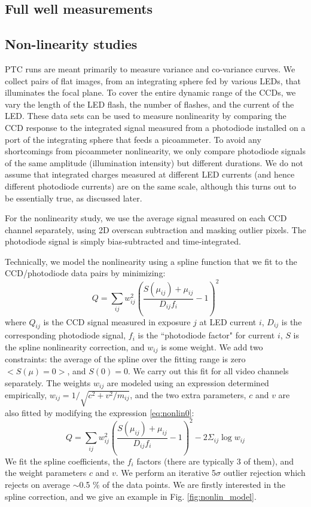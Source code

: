 \subsection{Full well measurements}\label{fullwell}

\subsection{Non-linearity studies}\label{nonlinearity}
PTC runs are meant primarily to measure variance and co-variance curves. We collect pairs of flat images, from an integrating sphere fed by various LEDs, that  illuminates the focal plane. To cover the entire dynamic range of the CCDs, we vary the length of the LED flash, the number of flashes, and the current of the LED. These data sets can be used to measure nonlinearity by comparing the CCD response to the integrated signal measured from a photodiode installed on a port of the integrating sphere that feeds a picoammeter. To avoid any shortcomings from picoammeter nonlinearity, we only compare photodiode signals of the same amplitude (illumination intensity) but different durations. We do not assume that integrated charges measured at different LED currents (and hence different photodiode currents) are on the same scale, although this turns out to be essentially true, as discussed later. 

For the nonlinearity study, we use the average signal measured on each CCD channel separately, using 2D overscan subtraction and masking outlier pixels. The photodiode signal is simply bias-subtracted and time-integrated. 

Technically, we model the nonlinearity using a spline function that we fit to the CCD/photodiode data pairs by minimizing:
\begin{equation}
Q = \sum_{ij} w_{ij}^2 \left( \frac{ S(\mu_{ij}) +\mu_{ij}  }{D_{ij} f_i} -1 \right)^2
\label{eq:nonlin0}
\end{equation}
where $Q_{ij}$ is the CCD signal measured in exposure $j$ at LED current $i$,
$D_{ij}$ is the corresponding photodiode signal, $f_i$ is the ``photodiode factor" for current $i$, $S$ is the spline nonlinearity correction, and $w_{ij}$ is some weight. We add two constraints: the average of the spline over the fitting range is zero $<S(\mu)=0>$, and $S(0) = 0$. We carry out this fit for all video channels separately. The weights $w_{ij}$ are modeled using an expression determined empirically, $w_{ij} = 1/\sqrt{c^2+v^2/m_{ij}}$, and the two extra parameters, $c$ and $v$ are also fitted by modifying the expression \ref{eq:nonlin0}:
\begin{equation}
Q = \sum_{ij} w_{ij}^2 \left( \frac{ S(\mu_{ij}) +\mu_{ij}  }{D_{ij} f_i} -1 \right)^2 - 2 \Sigma_{ij} \log w_{ij}
\label{eq:nonlin1}
\end{equation}
We fit the spline coefficients, the $f_i$ factors (there are typically 3 of them), and the weight parameters $c$ and $v$. We perform an iterative 5$\sigma$ outlier rejection which rejects on average $\sim $0.5 \% of the data points.  
We are firstly interested in the spline correction, and we give an example in Fig. \ref{fig:nonlin_model}.

